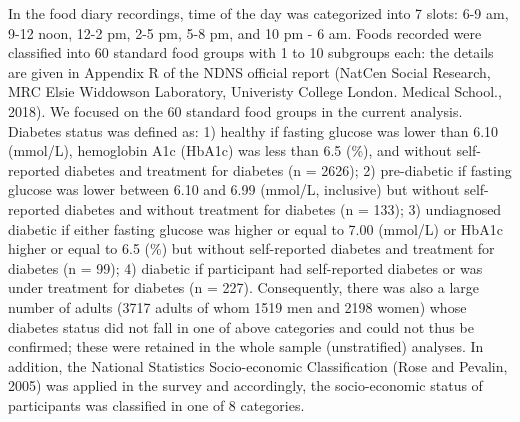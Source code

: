 \documentclass[utf8]{frontiersSCNS}
\begin{document}
In the food diary recordings, time of the day was categorized into 7
slots: 6-9 am, 9-12 noon, 12-2 pm, 2-5 pm, 5-8 pm, and 10 pm - 6 am.
Foods recorded were classified into 60 standard food groups with 1 to 10
subgroups each: the details are given in Appendix R of the NDNS official
report (NatCen Social Research, MRC Elsie Widdowson Laboratory,
Univeristy College London. Medical School., 2018). We focused on the 60
standard food groups in the current analysis. Diabetes status was
defined as: 1) healthy if fasting glucose was lower than 6.10 (mmol/L),
hemoglobin A1c (HbA1c) was less than 6.5 (\%), and without self-reported
diabetes and treatment for diabetes (n = 2626); 2) pre-diabetic if
fasting glucose was lower between 6.10 and 6.99 (mmol/L, inclusive) but
without self-reported diabetes and without treatment for diabetes (n =
133); 3) undiagnosed diabetic if either fasting glucose was higher or
equal to 7.00 (mmol/L) or HbA1c higher or equal to 6.5 (\%) but without
self-reported diabetes and treatment for diabetes (n = 99); 4) diabetic
if participant had self-reported diabetes or was under treatment for
diabetes (n = 227). Consequently, there was also a large number of
adults (3717 adults of whom 1519 men and 2198 women) whose diabetes
status did not fall in one of above categories and could not thus be
confirmed; these were retained in the whole sample (unstratified)
analyses. In addition, the National Statistics Socio-economic
Classification (Rose and Pevalin, 2005) was applied in the survey and
accordingly, the socio-economic status of participants was classified in
one of 8 categories.
\end{document}
